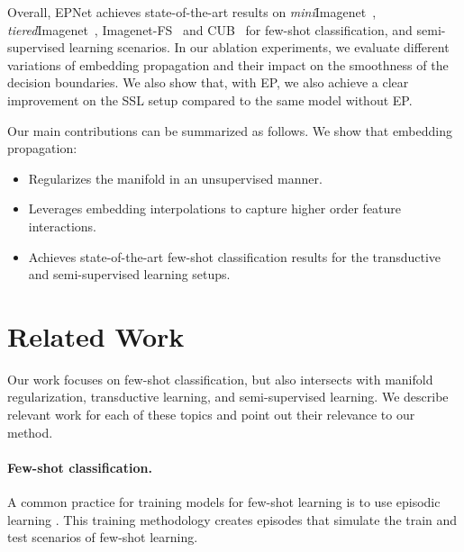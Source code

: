 \documentclass[runningheads]{llncs}
\begin{document}
Overall, EPNet achieves state-of-the-art results on \textit{mini}Imagenet~\cite{vinyals2016matching},\\ \textit{tiered}Imagenet~\cite{ren2015faster}, Imagenet-FS~\cite{hariharan2017low} and CUB~\cite{WelinderEtal2010} for  few-shot classification, and semi-supervised learning scenarios. In our ablation experiments, we evaluate different variations of embedding propagation and their impact on the smoothness of the decision boundaries. We also show that, with EP, we also achieve a clear improvement on the SSL setup compared to the same model without EP. 



Our main contributions can be summarized as follows. We show that  embedding propagation:

\begin{itemize}
    \item Regularizes the manifold in an unsupervised manner.
    \item Leverages embedding interpolations to capture higher order feature interactions.
    \item Achieves state-of-the-art few-shot classification results for the transductive and semi-supervised learning setups.
\end{itemize}

\section{Related Work}
Our work focuses on few-shot classification, but also intersects with manifold regularization, transductive learning, and semi-supervised learning. We describe relevant work for each of these topics and point out their relevance to our method.

\paragraph{Few-shot classification.}
A common practice for training models for few-shot learning is to use  episodic learning \cite{ravi2016optimization,vinyals2016matching,snell2017prototypical}. This training methodology creates episodes that simulate the train and test scenarios of few-shot learning.
\end{document}
